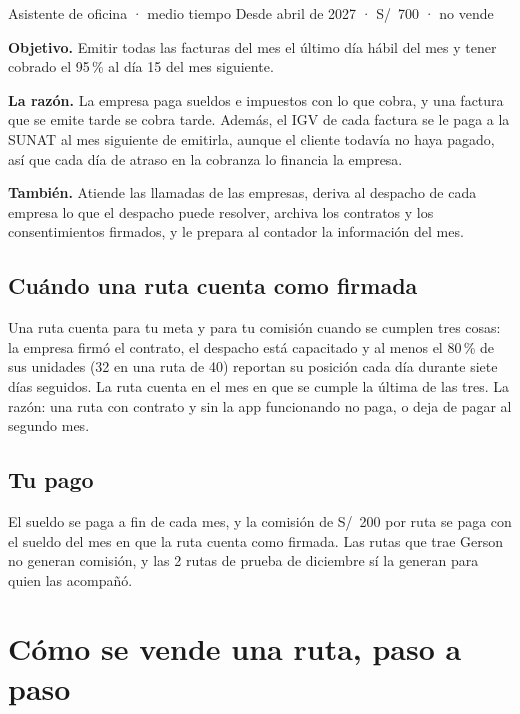 \documentclass[a4paper]{article}
\begin{document}
\begin{rol}{Asistente de oficina · medio tiempo}
{\small\color{tenue}Desde abril de 2027 · S/~700 · no vende}\par\vspace{4pt}
\textbf{Objetivo.} Emitir todas las facturas del mes el último día hábil del mes y tener cobrado el 95\,\% al día 15 del mes siguiente.

\textbf{La razón.} La empresa paga sueldos e impuestos con lo que cobra, y una factura que se emite tarde se cobra tarde. Además, el IGV de cada factura se le paga a la SUNAT al mes siguiente de emitirla, aunque el cliente todavía no haya pagado, así que cada día de atraso en la cobranza lo financia la empresa.

\textbf{También.} Atiende las llamadas de las empresas, deriva al despacho de cada empresa lo que el despacho puede resolver, archiva los contratos y los consentimientos firmados, y le prepara al contador la información del mes.
\end{rol}

\subsection{Cuándo una ruta cuenta como firmada}

Una ruta cuenta para tu meta y para tu comisión cuando se cumplen tres cosas: la empresa firmó el contrato, el despacho está capacitado y al menos el 80\,\% de sus unidades (32 en una ruta de 40) reportan su posición cada día durante siete días seguidos. La ruta cuenta en el mes en que se cumple la última de las tres. La razón: una ruta con contrato y sin la app funcionando no paga, o deja de pagar al segundo mes.

\subsection{Tu pago}

El sueldo se paga a fin de cada mes, y la comisión de S/~200 por ruta se paga con el sueldo del mes en que la ruta cuenta como firmada. Las rutas que trae Gerson no generan comisión, y las 2 rutas de prueba de diciembre sí la generan para quien las acompañó.

\section{Cómo se vende una ruta, paso a paso}
\end{document}
